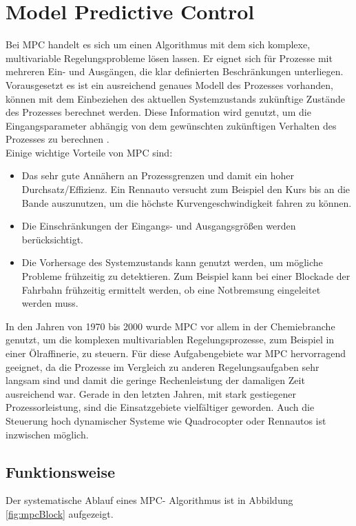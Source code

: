 \documentclass{like}
\begin{document}
\section{Model Predictive Control}
\label{MPC}
Bei \ac{MPC} handelt es sich um einen Algorithmus mit dem sich komplexe, multivariable Regelungsprobleme lösen lassen. Er eignet sich für Prozesse mit mehreren Ein- und Ausgängen, die klar definierten Beschränkungen unterliegen. Vorausgesetzt es ist ein ausreichend genaues Modell des Prozesses vorhanden, können mit dem Einbeziehen des aktuellen Systemzustands zukünftige Zustände des Prozesses berechnet werden. Diese Information wird genutzt, um die Eingangsparameter abhängig von dem gewünschten zukünftigen Verhalten des Prozesses zu berechnen \cite{seborg2010process}. \\
Einige wichtige Vorteile von \ac{MPC} sind: 
\begin{itemize}
	\item Das sehr gute Annähern an Prozessgrenzen und damit ein hoher Durchsatz/Effizienz. Ein Rennauto versucht zum Beispiel den Kurs bis an die Bande auszunutzen, um die höchste Kurvengeschwindigkeit fahren zu können.
	\item Die Einschränkungen der Eingangs- und Ausgangsgrößen werden berücksichtigt.
	\item Die Vorhersage des Systemzustands kann genutzt werden, um mögliche Probleme frühzeitig zu detektieren. Zum Beispiel kann bei einer Blockade der Fahrbahn frühzeitig ermittelt werden, ob eine Notbremsung eingeleitet werden muss.
\end{itemize}
In den Jahren von 1970 bis 2000 wurde \ac{MPC} vor allem in der Chemiebranche genutzt, um die komplexen multivariablen Regelungsprozesse, zum Beispiel in einer Ölraffinerie, zu steuern. Für diese Aufgabengebiete war \ac{MPC} hervorragend geeignet, da die Prozesse im Vergleich zu anderen Regelungsaufgaben sehr langsam sind und damit die geringe Rechenleistung der damaligen Zeit ausreichend war. 
Gerade in den letzten Jahren, mit stark gestiegener Prozessorleistung, sind die Einsatzgebiete vielfältiger geworden. Auch die Steuerung hoch dynamischer Systeme wie Quadrocopter \cite{quadcopterMpc} oder Rennautos \cite{carMPC} ist inzwischen möglich. 

\subsection*{Funktionsweise}
Der systematische Ablauf eines \ac{MPC}- Algorithmus ist in Abbildung \ref{fig:mpcBlock} aufgezeigt.  
\end{document}

